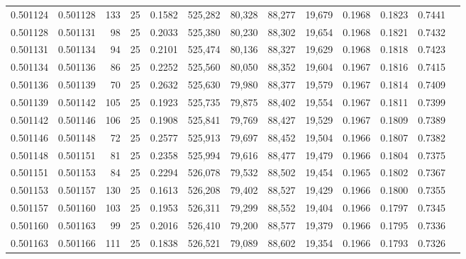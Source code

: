 \begin{tabular}{rrrrrrrrrrrrr}
0.501124 & 0.501128 & 133 &  25 &                                     0.1582 & 525,282 &  80,328 &  88,277 &  19,679 & 0.1968 & 0.1823 & 0.7441 \\
0.501128 & 0.501131 &  98 &  25 &                                     0.2033 & 525,380 &  80,230 &  88,302 &  19,654 & 0.1968 & 0.1821 & 0.7432 \\
0.501131 & 0.501134 &  94 &  25 &                                     0.2101 & 525,474 &  80,136 &  88,327 &  19,629 & 0.1968 & 0.1818 & 0.7423 \\
0.501134 & 0.501136 &  86 &  25 &                                     0.2252 & 525,560 &  80,050 &  88,352 &  19,604 & 0.1967 & 0.1816 & 0.7415 \\
0.501136 & 0.501139 &  70 &  25 &                                     0.2632 & 525,630 &  79,980 &  88,377 &  19,579 & 0.1967 & 0.1814 & 0.7409 \\
0.501139 & 0.501142 & 105 &  25 &                                     0.1923 & 525,735 &  79,875 &  88,402 &  19,554 & 0.1967 & 0.1811 & 0.7399 \\
0.501142 & 0.501146 & 106 &  25 &                                     0.1908 & 525,841 &  79,769 &  88,427 &  19,529 & 0.1967 & 0.1809 & 0.7389 \\
0.501146 & 0.501148 &  72 &  25 &                                     0.2577 & 525,913 &  79,697 &  88,452 &  19,504 & 0.1966 & 0.1807 & 0.7382 \\
0.501148 & 0.501151 &  81 &  25 &                                     0.2358 & 525,994 &  79,616 &  88,477 &  19,479 & 0.1966 & 0.1804 & 0.7375 \\
0.501151 & 0.501153 &  84 &  25 &                                     0.2294 & 526,078 &  79,532 &  88,502 &  19,454 & 0.1965 & 0.1802 & 0.7367 \\
0.501153 & 0.501157 & 130 &  25 &                                     0.1613 & 526,208 &  79,402 &  88,527 &  19,429 & 0.1966 & 0.1800 & 0.7355 \\
0.501157 & 0.501160 & 103 &  25 &                                     0.1953 & 526,311 &  79,299 &  88,552 &  19,404 & 0.1966 & 0.1797 & 0.7345 \\
0.501160 & 0.501163 &  99 &  25 &                                     0.2016 & 526,410 &  79,200 &  88,577 &  19,379 & 0.1966 & 0.1795 & 0.7336 \\
0.501163 & 0.501166 & 111 &  25 &                                     0.1838 & 526,521 &  79,089 &  88,602 &  19,354 & 0.1966 & 0.1793 & 0.7326 \\

\end{tabular}
